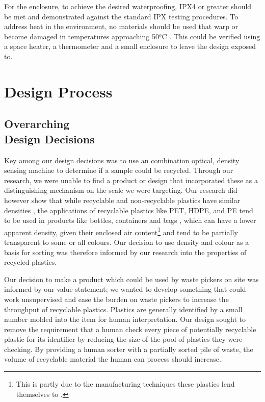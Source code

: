 \documentclass[12pt]{article}
\begin{document}
\begin{multicols*}{2}
            For the enclosure, to achieve the desired waterproofing, IPX4 \cite{gniazdo_2021} or greater should be met and demonstrated against the standard IPX testing procedures. To address heat in the environment, no materials should be used that warp or become damaged in temperatures approaching 50$^o$C \cite{GMET}. This could be verified using a space heater, a thermometer and a small enclosure to leave the design exposed to. 

    \section{Design Process}

        \subsection{Overarching \\ Design Decisions}
            Key among our design decisions was to use an combination optical, density sensing machine to determine if a sample could be recycled. Through our research, we were unable to find a product or design that incorporated these as a distinguishing mechanism on the scale we were targeting. Our research did however show that while recyclable and non-recyclable plastics have similar densities \cite{omnexus_2021}, the applications of recyclable plastics like PET, HDPE, and PE tend to be used in products like bottles, containers and bags \cite{HDPE} \cite{amp} \cite{omnexus_2017}, which can have a lower apparent density, given their enclosed air content\footnote{This is partly due to the manufacturing techniques these plastics lend themselves to \cite{thomas_2022}.} and tend to be partially transparent to some or all colours. Our decision to use density and colour as a basis for sorting was therefore informed by our research into the properties of recycled plastics. 
            
            Our decision to make a product which could be used by waste pickers on site was informed by our value statement; we wanted to develop something that could work unsupervised and ease the burden on waste pickers to increase the throughput of recyclable plastics. Plastics are generally identified by a small number molded into the item \cite{plasticactioncenter_2022} for human interpretation. Our design sought to remove the requirement that a human check every piece of potentially recyclable plastic for its identifier by reducing the size of the pool of plastics they were checking. By providing a human sorter with a partially sorted pile of waste, the volume of recyclable material the human can process should increase.  


\end{multicols*}
\end{document}

